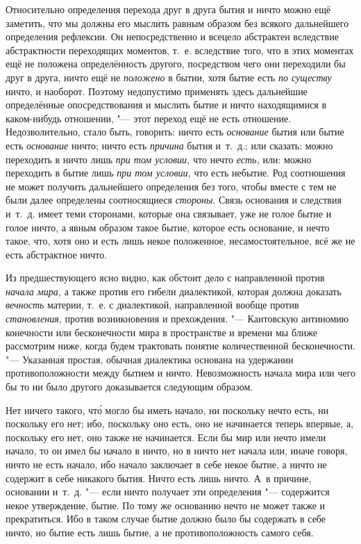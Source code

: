 Относительно определения перехода друг в друга бытия и ничто можно ещё
заметить, что мы должны его мыслить равным образом без всякого дальнейшего
определения рефлексии. Он непосредственно и всецело абстрактен вследствие
абстрактности переходящих моментов, т.~е. вследствие того, что в этих моментах
ещё не положена определённость другого, посредством чего они переходили бы друг
в друга, ничто ещё не {\em положено} в бытии, хотя бытие есть {\em по существу}
ничто, и наоборот. Поэтому недопустимо применять здесь дальнейшие определённые
опосредствования и мыслить бытие и ничто находящимися в каком-нибудь отношении,
"--- этот переход ещё не есть отношение. Недозволительно, стало быть, говорить:
ничто есть {\em основание} бытия или бытие есть {\em основание} ничто; ничто
есть {\em причина} бытия и~т.~д.; или сказать: можно переходить в ничто лишь
{\em при том условии,} что нечто {\em есть,} или: можно переходить в бытие лишь
{\em при том условии,} что есть небытие. Род соотношения не может получить
дальнейшего определения без того, чтобы вместе с тем не были далее определены
соотносящиеся {\em стороны}. Связь основания и следствия и~т.~д. имеет теми
сторонами, которые она связывает, уже не голое бытие и голое ничто, а явным
образом такое бытие, которое есть основание, и нечто такое, что, хотя оно и
есть лишь некое положенное, несамостоятельное, всё же не есть
абстрактное ничто.


Из предшествующего ясно видно, как обстоит дело с направленной против
{\em начала мира,} а также против его гибели диалектикой, которая должна
доказать {\em вечность} материи, т.~е. с диалектикой, направленной вообще
против {\em становления,} против возникновения и прехождения. "--- Кантовскую
антиномию конечности или бесконечности мира в пространстве и времени мы ближе
рассмотрим ниже, когда будем трактовать понятие количественной бесконечности.
"--- Указанная простая, обычная диалектика основана на удержании
противоположности между бытием и ничто. Невозможность начала мира или чего бы
то ни было другого доказывается следующим образом.

Нет ничего такого, чт\'{о} могло бы иметь начало, ни поскольку нечто есть, ни
поскольку его нет; ибо, поскольку оно есть, оно не начинается теперь впервые,
а, поскольку его нет, оно также не начинается. Если бы мир или нечто имели
начало, то он имел бы начало в ничто, но в ничто нет начала или, иначе говоря,
ничто не есть начало, ибо начало заключает в себе некое бытие, а ничто не
содержит в себе никакого бытия. Ничто есть лишь ничто. А~в причине, основании
и~т.~д. "--- если ничто получает эти определения "--- содержится некое
утверждение, бытие. По тому же основанию нечто не может также и прекратиться.
Ибо в таком случае бытие должно было бы содержать в себе ничто, но бытие есть
лишь бытие, а не противоположность самого себя.

